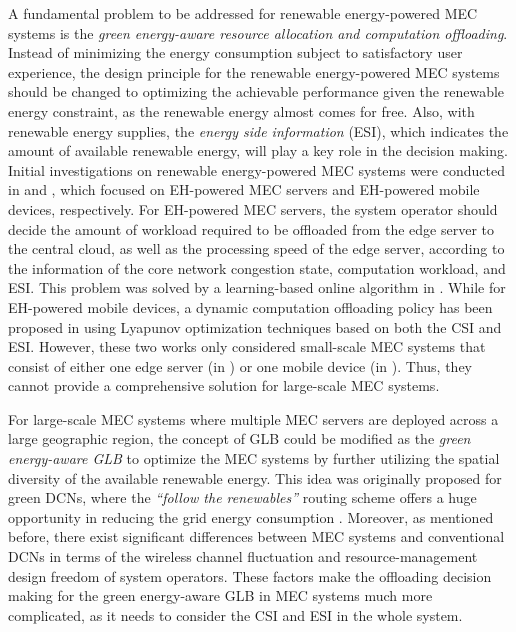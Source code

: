 \documentclass[journal]{IEEEtran}
\begin{document}
{A fundamental problem to be addressed for renewable energy-powered MEC systems is the \emph{green energy-aware resource allocation and computation offloading}. Instead of minimizing the energy consumption subject to satisfactory user experience, the design principle for the renewable energy-powered MEC systems should be changed to optimizing the achievable performance given the renewable energy constraint, as the renewable energy almost comes for free. Also, with renewable energy supplies, the \emph{energy side information} (ESI), which indicates the amount of available renewable energy, will play a key role in the decision making. Initial investigations on renewable energy-powered MEC systems were conducted in \cite{JXu1612GC} and \cite{YMao1612JSAC}, which focused on EH-powered MEC servers and EH-powered mobile devices, respectively. For EH-powered MEC servers, the system operator should decide the amount of workload required to be offloaded from the edge server to the central cloud, as well as the processing speed of the edge server, according to the information of the core network congestion state, computation workload, and ESI. This problem was solved by a learning-based online algorithm in \cite{JXu1612GC}. While for EH-powered mobile devices, a dynamic computation offloading policy has been proposed in \cite{YMao1612JSAC} using Lyapunov optimization techniques based on both the CSI and ESI. However, these two works only considered small-scale MEC systems that consist of either one edge server (in \cite{JXu1612GC}) or one mobile device (in \cite{YMao1612JSAC}). Thus, they cannot provide a comprehensive solution for large-scale MEC systems.




For large-scale MEC systems where multiple MEC servers are deployed across a large geographic region, the concept of GLB could be modified as the \emph{green energy-aware GLB} to optimize the MEC systems by further utilizing the spatial diversity of the available renewable energy. This idea was originally proposed for green DCNs, where the \emph{``follow the renewables''} routing scheme offers a huge opportunity in reducing the grid energy consumption \cite{MLin1206,CChenCloudCom1212,CDongIGCC1306,XSunCloudCom1511,TChenJSAC1603}. Moreover, as mentioned before, there exist significant differences between MEC systems and conventional DCNs in terms of the wireless channel fluctuation and resource-management design freedom of system operators. These factors make the offloading decision making for the green energy-aware GLB in MEC systems much more complicated, as it needs to consider the CSI and ESI in the whole system.

}
\end{document}
